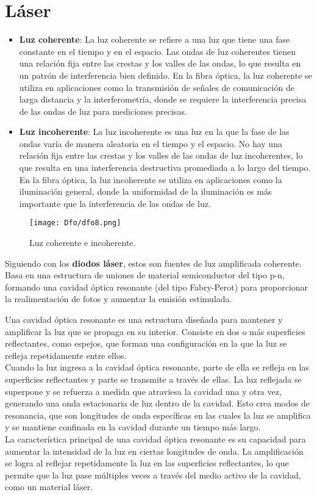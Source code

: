 \documentclass[
	12pt, %
	fleqn, %
	a4paper, %
	oneside, %
]{LegrandOrangeBook}
\begin{document}
\section{Láser}
\begin{itemize}
\item \textbf{Luz coherente}: La luz coherente se refiere a una luz que tiene una fase constante en el tiempo y en el espacio. Las ondas de luz coherentes tienen una relación fija entre las crestas y los valles de las ondas, lo que resulta en un patrón de interferencia bien definido. En la fibra óptica, la luz coherente se utiliza en aplicaciones como la transmisión de señales de comunicación de larga distancia y la interferometría, donde se requiere la interferencia precisa de las ondas de luz para mediciones precisas.
\item \textbf{Luz incoherente}: La luz incoherente es una luz en la que la fase de las ondas varía de manera aleatoria en el tiempo y el espacio. No hay una relación fija entre las crestas y los valles de las ondas de luz incoherentes, lo que resulta en una interferencia destructiva promediada a lo largo del tiempo. En la fibra óptica, la luz incoherente se utiliza en aplicaciones como la iluminación general, donde la uniformidad de la iluminación es más importante que la interferencia de las ondas de luz.
\end{itemize}
\begin{figure}[H]
\centering
\texttt{[image: Dfo/dfo8.png]}
\caption{Luz coherente e incoherente.}
\end{figure}
Siguiendo con los \textbf{diodos láser}, estos son fuentes de luz amplificada coherente. Basa en una estructura de uniones de material semiconductor del tipo p-n, formando una cavidad óptica resonante  (del tipo Fabry-Perot) para proporcionar la realimentación de fotos y aumentar la emisión estimulada.
\begin{definition}
Una cavidad óptica resonante es una estructura diseñada para mantener y amplificar la luz que se propaga en su interior. Consiste en dos o más superficies reflectantes, como espejos, que forman una configuración en la que la luz se refleja repetidamente entre ellos.\\
Cuando la luz ingresa a la cavidad óptica resonante, parte de ella se refleja en las superficies reflectantes y parte se transmite a través de ellas. La luz reflejada se superpone y se refuerza a medida que atraviesa la cavidad una y otra vez, generando una onda estacionaria de luz dentro de la cavidad. Esto crea modos de resonancia, que son longitudes de onda específicas en las cuales la luz se amplifica y se mantiene confinada en la cavidad durante un tiempo más largo.\\
La característica principal de una cavidad óptica resonante es su capacidad para aumentar la intensidad de la luz en ciertas longitudes de onda. La amplificación se logra al reflejar repetidamente la luz en las superficies reflectantes, lo que permite que la luz pase múltiples veces a través del medio activo de la cavidad, como un material láser.
\end{definition}
\end{document}
